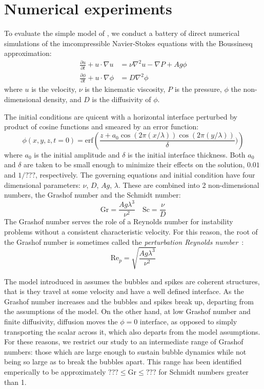 \section{Numerical experiments}

To evaluate the simple model of , we conduct a battery of direct numerical simulations of the imcompressible Navier-Stokes equations with the Boussinesq approximation:
\begin{align}
\frac{\partial u}{\partial t} + u \cdot \nabla u &= \nu \nabla^2 u - \nabla P + A g \phi \\
\frac{\partial \phi}{\partial t} + u \cdot \nabla \phi &= D \nabla^2 \phi 
\end{align}
where $u$ is the velocity,
$\nu$ is the kinematic viscosity,
$P$ is the pressure,
$\phi$ the non-dimensional density,
and $D$ is the diffusivity of $\phi$.

The initial conditions are quicent with a horizontal interface perturbed by product of cosine functions and smeared by an error function:
\begin{equation}
\phi(x,y,z,t=0) = \text{erf}\left(\frac{z + a_0 \cos(2 \pi (x/\lambda)) \cos(2 \pi (y/\lambda))}{\delta})\right)
\end{equation}
where $a_0$ is the initial amplitude and $\delta$ is the initial interface thickness.
Both $a_0$ and $\delta$ are taken to be small enough to minimize their effects on the solution, $0.01$ and $1/???$, respectively.
The governing equations and initial condition have four dimensional parameters: $\nu$, $D$, $Ag$, $\lambda$.
These are combined into 2 non-dimensional numbers, the Grashof number and the Schmidt number:
\begin{equation}
\text{Gr} = \frac{A g \lambda^3}{\nu^2} \quad \text{Sc} = \frac{\nu}{D}
\end{equation}
The Grashof number serves the role of a Reynolds number for instability problems without a consistent characteristic velocity.
For this reason, the root of the Grashof number is sometimes called the \textit{perturbation Reynolds number}~\cite{Wei2011}:
\begin{equation}
\text{Re}_p = \sqrt{\frac{A g \lambda^3}{\nu^2}}
\end{equation}

The model introduced in  assumes the bubbles and spikes are coherent structures, that is they travel at some velocity and have a well defined interface.
As the Grashof number increases and the bubbles and spikes break up, departing from the assumptions of the model.
On the other hand, at low Grashof number and finite diffusivity, diffusion moves the $\phi = 0$ interface, as opposed to simply transporting the scalar across it, which also departs from the model assumptions.
For these reasons, we restrict our study to an intermediate range of Grashof numbers: those which are large enough to sustain bubble dynamics while not being so large as to break the bubbles apart.
This range has been identified emperically to be approximately $??? \le \text{Gr} \le ???$ for Schmidt numbers greater than 1.


